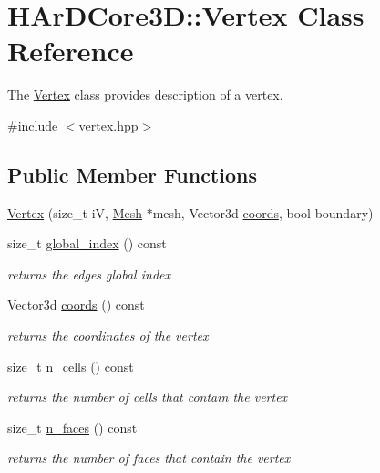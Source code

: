 \hypertarget{classHArDCore3D_1_1Vertex}{}\section{H\+Ar\+D\+Core3D\+:\+:Vertex Class Reference}
\label{classHArDCore3D_1_1Vertex}


The \hyperlink{classHArDCore3D_1_1Vertex}{Vertex} class provides description of a vertex.  




{\ttfamily \#include $<$vertex.\+hpp$>$}

\subsection*{Public Member Functions}
\begin{DoxyCompactItemize}
\item 
\hyperlink{classHArDCore3D_1_1Vertex_a30e7743fc40f1b771b9dad963a9badd1}{Vertex} (size\+\_\+t iV, \hyperlink{classHArDCore3D_1_1Mesh}{Mesh} $\ast$mesh, Vector3d \hyperlink{group__Mesh_ga8b06a63ada3bfd88e6429e5cfd028c0b}{coords}, bool boundary)
\item 
size\+\_\+t \hyperlink{group__Mesh_gab6a570ed052f6bb7ad6570f83cbae6a9}{global\+\_\+index} () const
\begin{DoxyCompactList}\small\item\em returns the edges global index \end{DoxyCompactList}\item 
Vector3d \hyperlink{group__Mesh_ga8b06a63ada3bfd88e6429e5cfd028c0b}{coords} () const
\begin{DoxyCompactList}\small\item\em returns the coordinates of the vertex \end{DoxyCompactList}\item 
size\+\_\+t \hyperlink{group__Mesh_ga52a24c4c5fbdc474b5a5e379d037f2e4}{n\+\_\+cells} () const
\begin{DoxyCompactList}\small\item\em returns the number of cells that contain the vertex \end{DoxyCompactList}\item 
size\+\_\+t \hyperlink{group__Mesh_ga0a651dc9116346e6a7304848ed538cc3}{n\+\_\+faces} () const
\begin{DoxyCompactList}\small\item\em returns the number of faces that contain the vertex \end{DoxyCompactList}\item 

\end{DoxyCompactItemize}
